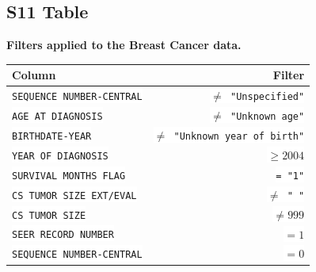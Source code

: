 \documentclass[10pt,letterpaper]{article}
\newcommand{\codewhite}[1]{\colorbox{white}{\texttt{#1}}}
\begin{document}
\subsection*{S11 Table}
\label{S11_Table}
{\bf Filters applied to the Breast Cancer data.}
\begin{table}[H]
\begin{adjustwidth}{-2.25in}{0in} %
\begin{tabular}{lr}
\toprule
 Column &  Filter \\
\midrule
\codewhite{SEQUENCE NUMBER-CENTRAL} & \codewhite{$\neq$ "Unspecified"} \\
\codewhite{AGE AT DIAGNOSIS} & \codewhite{$\neq$ "Unknown age"} \\
\codewhite{BIRTHDATE-YEAR} & \codewhite{$\neq$ "Unknown year of birth"} \\
\codewhite{YEAR OF DIAGNOSIS} & \codewhite{$\geq 2004$} \\
\codewhite{SURVIVAL MONTHS FLAG} & \codewhite{= "1"}\\
\codewhite{CS TUMOR SIZE EXT/EVAL} & \codewhite{$\neq$ " "} \\
\codewhite{CS TUMOR SIZE} & \codewhite{$\neq 999$} \\
\codewhite{SEER RECORD NUMBER} & \codewhite{$= 1$} \\
\codewhite{SEQUENCE NUMBER-CENTRAL} & \codewhite{$=0$} \\
\bottomrule
\end{tabular}
\end{adjustwidth}
\end{table}
\end{document}
